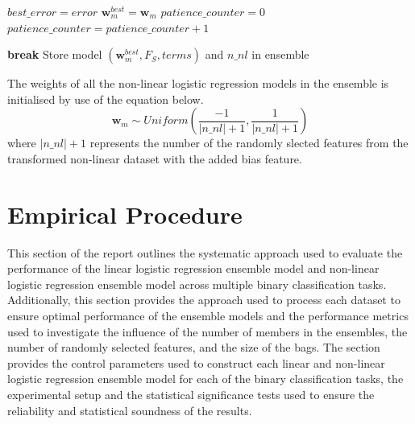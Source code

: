 \documentclass[10pt, conference]{IEEEtran}
\begin{document}
\begin{algorithm}[htbp]
\begin{algorithmic}[1]
                    \State $best\_error = error$
                    \State $\textbf{w}_m^{best} = \textbf{w}_m$
                    \State $patience\_counter = 0$
                \Else
                    \State $patience\_counter = patience\_counter + 1$
                \EndIf
                
                    \State \textbf{break}
                \EndIf
            \EndFor
            \State Store model $(\textbf{w}_m^{best}, F_S, terms)$ and $n\_nl$ in ensemble
        \EndFor
    \end{algorithmic}
\end{algorithm}

The weights of all the non-linear logistic regression models in the ensemble is initialised by use of the
equation below.
\begin{equation}
    \textbf{w}_m \sim Uniform \left( \frac{-1}{|n\_nl|+1}, \frac{1}{|n\_nl|+1} \right)
\end{equation}
where $|n\_nl| + 1$ represents the number of the randomly slected features from the transformed non-linear dataset
with the added bias feature.

\begin{figure}[H]
\end{figure}
\begin{figure}[H]
\end{figure}

\section{Empirical Procedure} \label{section: Empeirical Procedure}

This section of the report outlines the systematic approach used to evaluate the performance of the 
linear logistic regression ensemble model and non-linear logistic regression ensemble model
across multiple binary classification tasks. Additionally, this section provides the approach
used to process each dataset to ensure optimal performance of the ensemble models and the performance
metrics used to investigate the influence of the number of members in the
ensembles, the number of randomly selected features, and the size of the bags.
The section provides the control parameters used to construct each
linear and non-linear logistic regression ensemble model for each of the binary classification tasks,
the experimental setup and the statistical significance tests used to ensure the reliability and statistical
soundness of the results.
\end{document}
